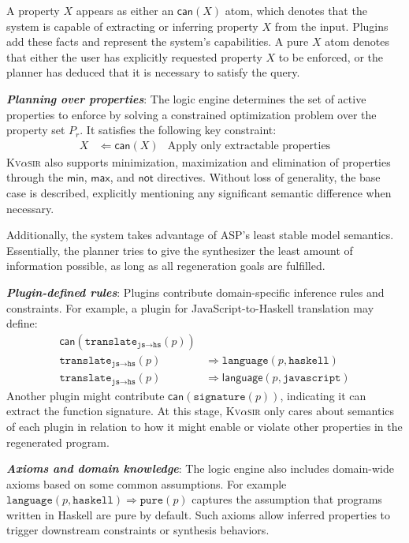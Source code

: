 \documentclass[nonacm,sigplan,review]{acmart}
\newcommand{\sys}{{\scshape Kv{$\alpha$}sir}\xspace}
\newcommand{\heading}[1]{\vspace{2pt}\noindent\textbf{\emph{#1}}:\enspace}
\begin{document}
A property $X$ appears as either an
  $\mathsf{can}(X)$ atom, which denotes that the system is capable of extracting or inferring property $X$ from the input.
  Plugins add these facts and represent the system's capabilities.
  A pure $X$ atom denotes that either the user has explicitly requested property $X$ to be enforced, or the planner has deduced that it is necessary to satisfy the query.

\heading{Planning over properties}
The logic engine determines the set of active properties to enforce by solving
a constrained optimization problem over the property set $P_r$.
It satisfies the
following key constraint:
\begin{align*}
  X &\Leftarrow \mathsf{can}(X) &\text{Apply only extractable properties}
\end{align*}
\sys also supports minimization, maximization and elimination of properties
through the $\mathsf{min}$, $\mathsf{max}$, and $\mathsf{not}$ directives.
Without loss of generality, the base case is described, explicitly mentioning any significant semantic difference when necessary.

Additionally, the system takes advantage of ASP's least stable model semantics.
Essentially, the planner tries to give the synthesizer the least amount of information
possible, as long as all regeneration goals are fulfilled.

\heading{Plugin-defined rules}
Plugins contribute domain-specific inference rules and constraints. For example, a plugin for JavaScript-to-Haskell translation may define:
\begin{align*}
\mathsf{can}(\texttt{translate}_{\texttt{js} \rightarrow \texttt{hs}}(p)) & \\
\texttt{translate}_{\texttt{js} \rightarrow \texttt{hs}}(p) &\Rightarrow \texttt{language}(p, \texttt{haskell}) \\
\texttt{translate}_{\texttt{js} \rightarrow \texttt{hs}}(p) &\Rightarrow \mathsf{language}(p, \texttt{javascript})
\end{align*}
Another plugin might contribute $\mathsf{can}(\texttt{signature}(p))$, indicating it can extract the function signature. At this stage, \sys only cares about semantics of each plugin in relation to how it might enable or violate 
other properties in the regenerated program.

\heading{Axioms and domain knowledge}
The logic engine also includes domain-wide axioms based on some common assumptions.
For example
$\texttt{language}(p, \texttt{haskell}) \Rightarrow \texttt{pure}(p)$
captures the assumption that programs written in Haskell are pure by default.
Such axioms allow inferred properties to trigger downstream constraints or synthesis behaviors.
\end{document}
